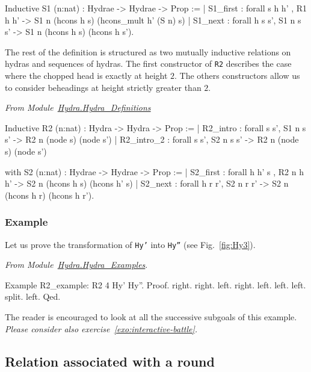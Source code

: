 \documentclass[a4paper]{book}
\begin{document}
\begin{Coqsrc}
Inductive S1 (n:nat)  : Hydrae -> Hydrae -> Prop :=
| S1_first : forall s h h' ,   R1 h h' -> 
                  S1 n (hcons h s) (hcons_mult h' (S n) s)
| S1_next : forall h s s',  S1 n s s' ->
                   S1 n (hcons h s) (hcons h s').
\end{Coqsrc}


The rest of the definition is structured as two mutually inductive relations on hydras and sequences of hydras. The first constructor of \texttt{R2} describes the case where the chopped head is exactly at height $2$. The others constructors allow us to consider beheadings at height strictly greater than $2$.


\vspace{4pt}
\emph{From Module~\href{../src/html/hydras.Hydra.Hydra_Definitions.html\#R2}{Hydra.Hydra\_Definitions}}

\begin{Coqsrc}
Inductive R2 (n:nat)  :  Hydra -> Hydra -> Prop :=
| R2_intro : forall s s', S1 n s s' -> R2 n (node s) (node s')
| R2_intro_2 : forall s s', S2 n s s' -> R2 n (node s) (node s')

with S2 (n:nat) :  Hydrae -> Hydrae -> Prop :=
|  S2_first : forall h h' s ,
               R2 n  h h'  -> 
               S2  n (hcons h s) (hcons h'  s)
|  S2_next  : forall h   r r',
               S2 n   r r' ->
               S2 n (hcons h r) (hcons h r').                  
\end{Coqsrc}


\subsubsection{Example}
Let us prove the transformation of \texttt{Hy'} into \texttt{Hy''} (see Fig.~\vref{fig:Hy3}).

\vspace{4pt}\emph{From Module~\href{../src/html/hydras.Hydra.Hydra_Examples.html}{Hydra.Hydra\_Examples}}. 

\begin{Coqsrc}
Example R2_example:  R2 4 Hy' Hy''.
Proof.
  right. right. left.  right. left. left. left. split. left.
Qed.
\end{Coqsrc}

The reader is encouraged to look at all the successive subgoals of this example.
\emph{Please consider also exercise~\vref{exo:interactive-battle}.}


\subsection{Relation associated with a round}
\end{document}
